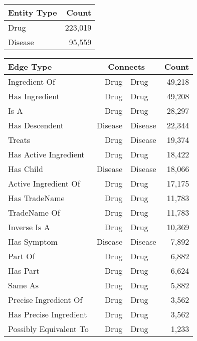 \documentclass[11pt, a4paper]{article}
\begin{document}
\begin{table}[htb]
    \centering
    \begin{tabular}{l r}
        \toprule
        \bf{Entity Type}   & \bf{Count} \\
        \midrule
        Drug                      & 223,019  \\
        Disease                   & 95,559 \\
        \bottomrule
    \end{tabular}
    \vspace{8pt}
    \begin{tabular}{l r@{ \ $\rightarrow$ \ }l r}
        \toprule
        \bf{Edge Type} &\multicolumn{2}{c}{\bf{Connects}} & \bf{Count}\\
        \midrule
        Ingredient Of         & Drug    & Drug    & 49,218 \\
        Has Ingredient        & Drug    & Drug    & 49,208 \\
        Is A                  & Drug    & Drug    & 28,297 \\
        Has Descendent        & Disease & Disease & 22,344 \\
        Treats                & Drug    & Disease & 19,374 \\
        Has Active Ingredient & Drug    & Drug    & 18,422 \\
        Has Child             & Disease & Disease & 18,066 \\
        Active Ingredient Of  & Drug    & Drug    & 17,175 \\
        Has TradeName         & Drug    & Drug    & 11,783 \\
        TradeName Of          & Drug    & Drug    & 11,783 \\
        Inverse Is A          & Drug    & Drug    & 10,369 \\
        Has Symptom           & Disease & Disease & 7,892  \\
        Part Of               & Drug    & Drug    & 6,882  \\
        Has Part              & Drug    & Drug    & 6,624  \\
        Same As               & Drug    & Drug    & 5,882  \\
        Precise Ingredient Of & Drug    & Drug    & 3,562  \\
        Has Precise Ingredient& Drug    & Drug    & 3,562  \\
        Possibly Equivalent To& Drug    & Drug    & 1,233  \\

\end{tabular}
\end{table}
\end{document}
